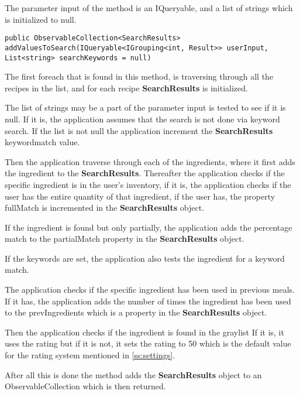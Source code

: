 The parameter input of the method is an IQueryable, and a list of strings which is initialized to null.

\begin{lstlisting}[caption=addValuesToSearch, label={lst:addValuesToSearch}, language=CSharp]
        public ObservableCollection<SearchResults> addValuesToSearch(IQueryable<IGrouping<int, Result>> userInput, List<string> searchKeywords = null)
\end{lstlisting}

The first foreach that is found in this method, is traversing through all the recipes in the list, and for each recipe \textbf{SearchResults} is initialized.

The list of strings may be a part of the parameter input is tested to see if it is null. If it is, the application assumes that the search is not done via keyword search. If the list is not null the application increment the \textbf{SearchResults} keywordmatch value.

Then the application traverse through each of the ingredients, where it first adds the ingredient to the \textbf{SearchResults}. Thereafter the application checks if the specific ingredient is in the user's inventory, if it is, the application checks if the user has the entire quantity of that ingredient, if the user has, the property fullMatch is incremented in the \textbf{SearchResults} object.

If the ingredient is found but only partially, the application adds the percentage match to the partialMatch property in the \textbf{SearchResults} object.

If the keywords are set, the application also tests the ingredient for a keyword match.

The application checks if the specific ingredient has been used in previous meals.
If it has, the application adds the number of times the ingredient has been used to the prevIngredients which is a property in the \textbf{SearchResults} object.

Then the application checks if the ingredient is found in the graylist If it is, it uses the rating but if it is not, it sets the rating to 50 which is the default value for the rating system mentioned in \cref{ss:settings}.

After all this is done the method adds the \textbf{SearchResults} object to an ObservableCollection which is then returned.
